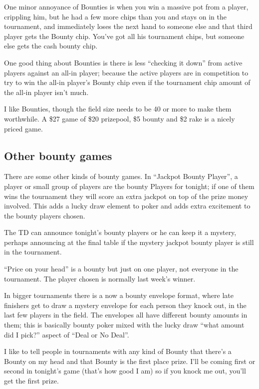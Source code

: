 One minor annoyance of Bounties is when you win a massive pot
from a player, crippling him, but he had a few more chips than
you and stays on in the tournament, and immediately loses the
next hand to someone else and that third player gets the
Bounty chip. You've got all his tournament chips, but someone
else gets the cash bounty chip.

One good thing about Bounties is there is less ``checking it down''
from active players against an all-in player; because the active
players are in competition to try to win the all-in player's
Bounty chip even if the tournament chip amount of the all-in player
isn't much.

I like Bounties, though the field size needs to be 40 or more to
make them worthwhile. A \$27 game of \$20 prizepool, \$5 bounty
and \$2 rake is a nicely priced game.

\subsection{Other bounty games}

There are some other kinds of bounty games. In ``Jackpot Bounty
Player'', a player or small group of players are the
bounty Players for tonight; if one of them wins
the tournament they will score an extra jackpot on top of
the prize money involved. This adds a lucky draw element to
poker and adds extra excitement to the bounty players chosen.

The TD can announce tonight's bounty players or he can keep it a
mystery, perhaps announcing at the final table if the mystery jackpot
bounty player is still in the tournament.

``Price on your head'' is a bounty but just on one player, not
everyone in the tournament. The player chosen is normally last week's
winner.

In bigger tournaments there is a now a bounty envelope format, where
late finishers get to draw a mystery envelope for each person they
knock out, in the last few players in the field. The envelopes all
have different bounty amounts in them; this is basically bounty poker
mixed with the lucky draw ``what amount did I pick?'' aspect of ``Deal
or No Deal''.

I like to tell people in tournaments with any kind of Bounty
that there's a Bounty on my head and that Bounty is the first
place prize. I'll be coming first or second in tonight's game (that's
how good I am) so if you knock me out, you'll get the first prize.

